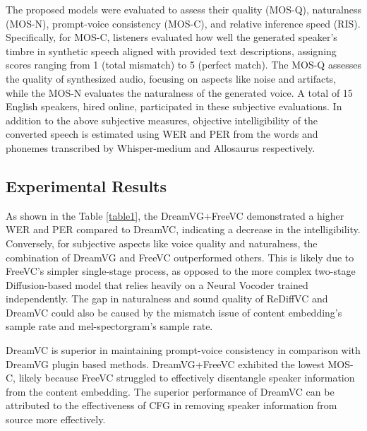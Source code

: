 \documentclass{Interspeech2024}
\begin{document}
The proposed models were evaluated to assess their quality (MOS-Q), naturalness (MOS-N), prompt-voice consistency (MOS-C), and relative inference speed (RIS). Specifically, for MOS-C, listeners evaluated how well the generated speaker's timbre in synthetic speech aligned with provided text descriptions, assigning scores ranging from 1 (total mismatch) to 5 (perfect match). The MOS-Q assesses the quality of synthesized audio, focusing on aspects like noise and artifacts, while the MOS-N evaluates the naturalness of the generated voice.
A total of 15 English speakers, hired online, participated in these subjective evaluations. In addition to the above subjective measures, objective intelligibility of the converted speech is estimated using WER and PER from the words and phonemes transcribed by Whisper-medium \cite{radford2023robust} and Allosaurus \cite{li2020universal} respectively.



\subsection{Experimental Results}

As shown in the Table \ref{table1},
the DreamVG+FreeVC demonstrated a higher WER and PER compared to DreamVC, indicating a decrease in the intelligibility. Conversely, for subjective aspects like voice quality and naturalness, the combination of DreamVG and FreeVC outperformed others. This is likely due to FreeVC's simpler single-stage process, as opposed to the more complex two-stage Diffusion-based model that relies heavily on a Neural Vocoder trained independently. The gap in naturalness and sound quality of ReDiffVC and DreamVC could also be caused by the mismatch issue of content embedding's sample rate and mel-spectorgram's sample rate.

DreamVC is superior in maintaining prompt-voice consistency in comparison with DreamVG plugin based methods. DreamVG+FreeVC exhibited the lowest MOS-C, likely because FreeVC struggled to effectively disentangle speaker information from the content embedding. The superior performance of DreamVC can be attributed to the effectiveness of CFG in removing speaker information from source more effectively. 
\end{document}
